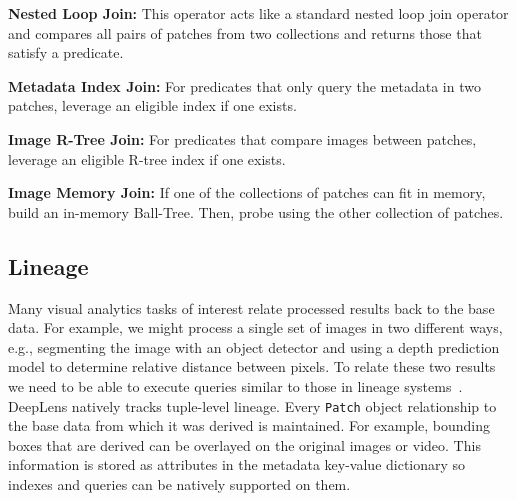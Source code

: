 \vspace{0.25em}
\noindent \textbf{Nested Loop Join: } This operator acts like a standard nested loop join operator and compares all pairs of patches from two collections and returns those that satisfy a predicate.

\vspace{0.25em}
\noindent \textbf{Metadata Index Join: } For predicates that only query the metadata in two patches, leverage an eligible index if one exists. 

\vspace{0.25em}
\noindent \textbf{Image R-Tree Join: } For predicates that compare images between patches, leverage an eligible R-tree index if one exists. 

\vspace{0.25em}
\noindent \textbf{Image Memory Join: } If one of the collections of patches can fit in memory, build an in-memory Ball-Tree. Then, probe using the other collection of patches.

\subsection{Lineage}
Many visual analytics tasks of interest relate processed results back to the base data.
For example, we might process a single set of images in two different ways, e.g., segmenting the image with an object detector and using a depth prediction model to determine relative distance between pixels.
To relate these two results we need to be able to execute queries similar to those in lineage systems~\cite{psallidas2018smoke}. 
\textsf{DeepLens} natively tracks tuple-level lineage.
Every \texttt{Patch} object relationship to the base data from which it was derived is maintained.
For example, bounding boxes that are derived can be overlayed on the original images or video.
This information is stored as attributes in the metadata key-value dictionary so indexes and queries can be natively supported on them.
